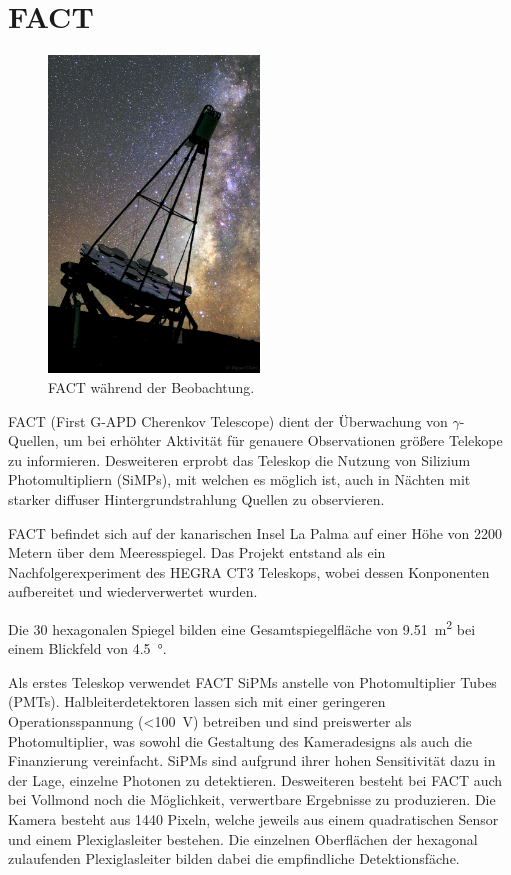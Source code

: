\chapter{FACT}
\begin{figure}
  \includegraphics[width=0.50\textwidth]{./images/FACT.jpg}
  \caption{FACT während der Beobachtung.\cite{factpic}}
  \label{fig:observ}
\end{figure}
FACT (First G-APD Cherenkov Telescope) dient der Überwachung von $\gamma$-Quellen, um bei erhöhter Aktivität für genauere Observationen größere Telekope zu informieren. 
Desweiteren erprobt das Teleskop die Nutzung von Silizium Photomultipliern (SiMPs), mit welchen es möglich ist, auch in Nächten mit starker diffuser Hintergrundstrahlung Quellen zu observieren. 

FACT befindet sich auf der kanarischen Insel La Palma auf einer Höhe von 2200 Metern über dem Meeresspiegel.
Das Projekt entstand als ein Nachfolgerexperiment des HEGRA CT3 Teleskops, wobei dessen Konponenten aufbereitet und wiederverwertet wurden.

Die 30 hexagonalen Spiegel bilden eine Gesamtspiegelfläche von \SI{9.51}{\meter\squared} bei einem Blickfeld von \SI{4.5}{\degree}. 

Als erstes Teleskop verwendet FACT SiPMs anstelle von Photomultiplier Tubes (PMTs). 
Halbleiterdetektoren lassen sich mit einer geringeren Operationsspannung (\SI{<100}{\volt}) betreiben und sind preiswerter als Photomultiplier, was sowohl die Gestaltung des Kameradesigns als auch die Finanzierung vereinfacht. 
SiPMs sind aufgrund ihrer hohen Sensitivität dazu in der Lage, einzelne Photonen zu detektieren. 
Desweiteren besteht bei FACT auch bei Vollmond noch die Möglichkeit, verwertbare Ergebnisse zu produzieren.
Die Kamera besteht aus 1440 Pixeln, welche jeweils aus einem quadratischen Sensor und einem Plexiglasleiter bestehen. Die einzelnen Oberflächen der hexagonal zulaufenden Plexiglasleiter bilden dabei die empfindliche Detektionsfäche.

